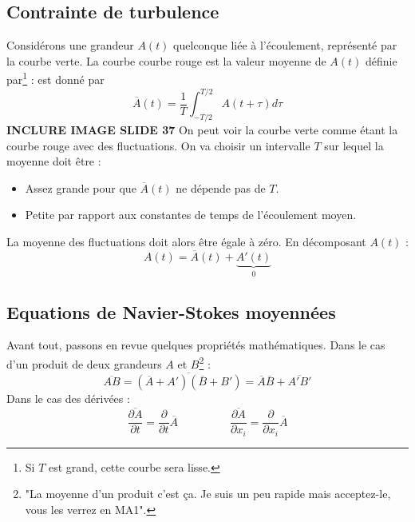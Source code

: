 	\subsection{Contrainte de turbulence}
	Considérons une grandeur $A(t)$ quelconque liée à l'écoulement, représenté par la courbe verte. 
	La courbe courbe rouge est la valeur moyenne de $A(t)$ définie par\footnote{Si $T$ est grand, 
	cette courbe sera lisse.} : 
	est donné par 
	\begin{equation}
	\overline{A}(t) = \frac{1}{T}\int_{-T/2}^{T/2} A(t+\tau)d\tau
	\end{equation}
	\textbf{INCLURE IMAGE SLIDE 37}
	On peut voir la courbe verte comme étant la courbe rouge avec des fluctuations. On va choisir 
	un intervalle $T$ sur lequel la moyenne doit être :
	\begin{itemize}
	\item Assez grande pour que $\overline{A}(t)$ ne dépende pas de $T$.
	\item Petite par rapport aux constantes de temps de l'écoulement moyen.
	\end{itemize}
	La moyenne des fluctuations doit alors être égale à zéro. En décomposant $A(t)$ :
	\begin{equation}
	A(t) = \overline{A}(t) + \underbrace{A'(t)}_{0}
	\end{equation}
	
	
	
	\subsection{Equations de Navier-Stokes moyennées}
	Avant tout, passons en revue quelques propriétés mathématiques. Dans le cas d'un produit de deux 
	grandeurs $A$ et $B$\footnote{"La moyenne d'un produit c'est ça. Je suis un peu rapide mais 
	acceptez-le, vous les verrez en MA1".} :
	\begin{equation}
	\overline{AB} = \overline{(\overline{A}+A')(\overline{B}+B')} = \overline{A}\overline{B} + 
	\overline{A'B'}
	\end{equation}
	Dans le cas des dérivées :
	\begin{equation}
	\frac{\overline{\partial A}}{\partial t} = \frac{\partial}{\partial t}\overline{A}\ \ \ \ \ \ 
	\ \ \ \ \ \ \ \ \ \ \ \ \ \ \ \frac{\overline{\partial A}}{\partial x_i} = \frac{\partial}{
	\partial x_i}\overline{A}
	\end{equation}
	
